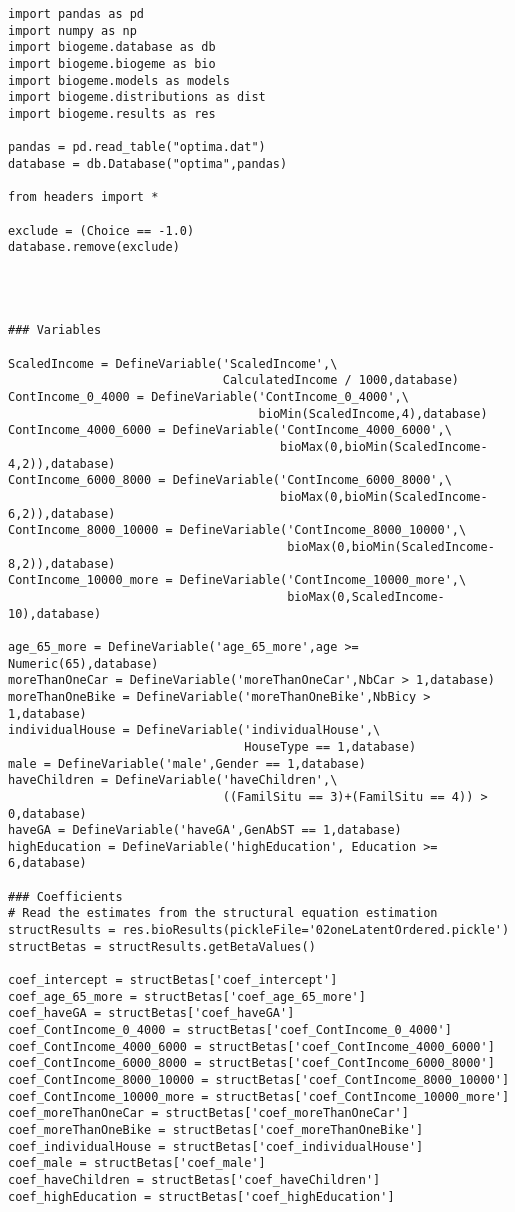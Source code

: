 \documentclass[12pt,a4paper]{article}
\begin{document}
\begin{lstlisting}[style=numbers]
import pandas as pd
import numpy as np
import biogeme.database as db
import biogeme.biogeme as bio
import biogeme.models as models
import biogeme.distributions as dist
import biogeme.results as res

pandas = pd.read_table("optima.dat")
database = db.Database("optima",pandas)

from headers import *

exclude = (Choice == -1.0)
database.remove(exclude)




### Variables

ScaledIncome = DefineVariable('ScaledIncome',\
                              CalculatedIncome / 1000,database)
ContIncome_0_4000 = DefineVariable('ContIncome_0_4000',\
                                   bioMin(ScaledIncome,4),database)
ContIncome_4000_6000 = DefineVariable('ContIncome_4000_6000',\
                                      bioMax(0,bioMin(ScaledIncome-4,2)),database)
ContIncome_6000_8000 = DefineVariable('ContIncome_6000_8000',\
                                      bioMax(0,bioMin(ScaledIncome-6,2)),database)
ContIncome_8000_10000 = DefineVariable('ContIncome_8000_10000',\
                                       bioMax(0,bioMin(ScaledIncome-8,2)),database)
ContIncome_10000_more = DefineVariable('ContIncome_10000_more',\
                                       bioMax(0,ScaledIncome-10),database)

age_65_more = DefineVariable('age_65_more',age >= Numeric(65),database)
moreThanOneCar = DefineVariable('moreThanOneCar',NbCar > 1,database)
moreThanOneBike = DefineVariable('moreThanOneBike',NbBicy > 1,database)
individualHouse = DefineVariable('individualHouse',\
                                 HouseType == 1,database)
male = DefineVariable('male',Gender == 1,database)
haveChildren = DefineVariable('haveChildren',\
                              ((FamilSitu == 3)+(FamilSitu == 4)) > 0,database)
haveGA = DefineVariable('haveGA',GenAbST == 1,database)
highEducation = DefineVariable('highEducation', Education >= 6,database)

### Coefficients
# Read the estimates from the structural equation estimation
structResults = res.bioResults(pickleFile='02oneLatentOrdered.pickle')
structBetas = structResults.getBetaValues()

coef_intercept = structBetas['coef_intercept']
coef_age_65_more = structBetas['coef_age_65_more']
coef_haveGA = structBetas['coef_haveGA']
coef_ContIncome_0_4000 = structBetas['coef_ContIncome_0_4000']
coef_ContIncome_4000_6000 = structBetas['coef_ContIncome_4000_6000']
coef_ContIncome_6000_8000 = structBetas['coef_ContIncome_6000_8000']
coef_ContIncome_8000_10000 = structBetas['coef_ContIncome_8000_10000']
coef_ContIncome_10000_more = structBetas['coef_ContIncome_10000_more']
coef_moreThanOneCar = structBetas['coef_moreThanOneCar']
coef_moreThanOneBike = structBetas['coef_moreThanOneBike']
coef_individualHouse = structBetas['coef_individualHouse']
coef_male = structBetas['coef_male']
coef_haveChildren = structBetas['coef_haveChildren']
coef_highEducation = structBetas['coef_highEducation']


\end{lstlisting}
\end{document}

